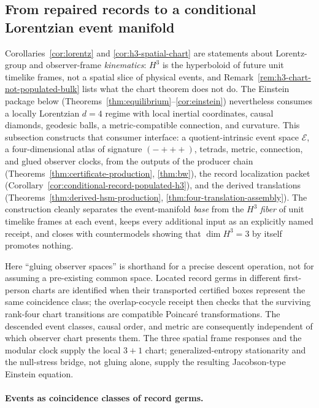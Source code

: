 \documentclass[11pt]{article}
\begin{document}
\subsection{From repaired records to a conditional Lorentzian event manifold}
\label{subsec:event-manifold}

Corollaries~\ref{cor:lorentz} and \ref{cor:h3-spatial-chart} are statements
about Lorentz-group and observer-frame \emph{kinematics}: \(H^3\) is the
hyperboloid of future unit timelike frames, not a spatial slice of physical
events, and Remark~\ref{rem:h3-chart-not-populated-bulk} lists what the chart
theorem does not do. The Einstein package below
(Theorems~\ref{thm:equilibrium}--\ref{cor:einstein}) nevertheless consumes a
locally Lorentzian \(d=4\) regime with local inertial coordinates, causal
diamonds, geodesic balls, a metric-compatible connection, and curvature. This
subsection constructs that consumer interface: a quotient-intrinsic event
space \(\mathcal E\), a four-dimensional atlas of signature \((-{+}{+}{+})\),
tetrads, metric, connection, and glued observer clocks, from the outputs of
the producer chain
(Theorems~\ref{thm:certificate-production}, \ref{thm:bw}), the record
localization packet (Corollary~\ref{cor:conditional-record-populated-h3}), and
the derived translations
(Theorems~\ref{thm:derived-hsm-production},
\ref{thm:four-translation-assembly}). The construction cleanly separates the
event-manifold \emph{base} from the \(H^3\) \emph{fiber} of unit timelike
frames at each event, keeps every additional input as an explicitly named
receipt, and closes with countermodels showing that \(\dim H^3=3\) by itself
promotes nothing.

Here ``gluing observer spaces'' is shorthand for a precise descent operation,
not for assuming a pre-existing common space. Located record germs in
different first-person charts are identified when their transported certified
boxes represent the same coincidence class; the overlap-cocycle receipt then
checks that the surviving rank-four chart transitions are compatible
Poincar\'e transformations. The descended event classes, causal order, and
metric are consequently independent of which observer chart presents them.
The three spatial frame responses and the modular clock supply the local
\(3{+}1\) chart; generalized-entropy stationarity and the null-stress bridge,
not gluing alone, supply the resulting Jacobson-type Einstein equation.

\paragraph{Events as coincidence classes of record germs.}
\end{document}
